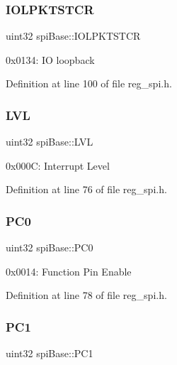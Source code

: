 \mbox{\label{structspiBase_af5e91e96b84b6911187f466bbfc31951}} 
\subsubsection{\texorpdfstring{I\+O\+L\+P\+K\+T\+S\+T\+CR}{IOLPKTSTCR}}
{\footnotesize\ttfamily uint32 spi\+Base\+::\+I\+O\+L\+P\+K\+T\+S\+T\+CR}

0x0134\+: IO loopback 

Definition at line 100 of file reg\+\_\+spi.\+h.

\mbox{\label{structspiBase_a0ab9168975f9cdc29c5a2b9593f03c92}} 
\subsubsection{\texorpdfstring{L\+VL}{LVL}}
{\footnotesize\ttfamily uint32 spi\+Base\+::\+L\+VL}

0x000C\+: Interrupt Level 

Definition at line 76 of file reg\+\_\+spi.\+h.

\mbox{\label{structspiBase_ac4a15943ed2c2f7a798f20a257847e57}} 
\subsubsection{\texorpdfstring{P\+C0}{PC0}}
{\footnotesize\ttfamily uint32 spi\+Base\+::\+P\+C0}

0x0014\+: Function Pin Enable 

Definition at line 78 of file reg\+\_\+spi.\+h.

\mbox{\label{structspiBase_aaac53456796e652368e8ea5f960db97c}} 
\subsubsection{\texorpdfstring{P\+C1}{PC1}}
{\footnotesize\ttfamily uint32 spi\+Base\+::\+P\+C1}

